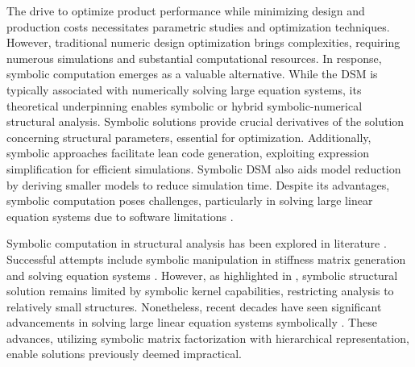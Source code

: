 The drive to optimize product performance while minimizing design and production costs necessitates parametric studies and optimization techniques. However, traditional numeric design optimization brings complexities, requiring numerous simulations and substantial computational resources. In response, symbolic computation emerges as a valuable alternative. While the \ac{DSM} is typically associated with numerically solving large equation systems, its theoretical underpinning enables symbolic or hybrid symbolic-numerical structural analysis. Symbolic solutions provide crucial derivatives of the solution concerning structural parameters, essential for optimization. Additionally, symbolic approaches facilitate lean code generation, exploiting expression simplification for efficient simulations. Symbolic \ac{DSM} also aids model reduction by deriving smaller models to reduce simulation time. Despite its advantages, symbolic computation poses challenges, particularly in solving large linear equation systems due to software limitations \cite{carette2006linear, zhou2007symbolic}.

Symbolic computation in structural analysis has been explored in literature \cite{noor1979computerized, pavlovic2003symbolic}. Successful attempts include symbolic manipulation in stiffness matrix generation \cite{cecchi1977automatic} and solving equation systems \cite{ioakimidis1992application, beltzer2012variational}. However, as highlighted in \cite{pavlovic2003symbolic}, symbolic structural solution remains limited by symbolic kernel capabilities, restricting analysis to relatively small structures. Nonetheless, recent decades have seen significant advancements in solving large linear equation systems symbolically \cite{carette2006linear, zhou2007symbolic}. These advances, utilizing symbolic matrix factorization with hierarchical representation, enable solutions previously deemed impractical.

